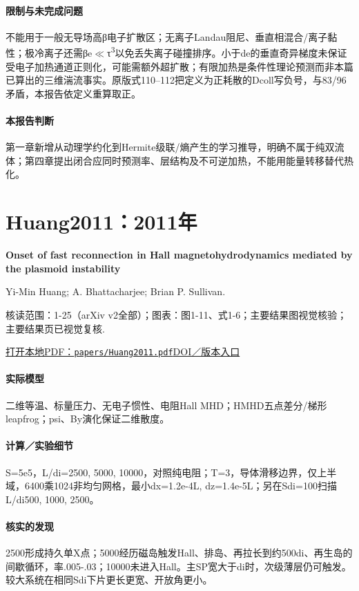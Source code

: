 \paragraph{限制与未完成问题}不能用于一般无导场高β电子扩散区；无离子Landau阻尼、垂直相混合/离子黏性；极冷离子还需βe\ensuremath{\ll}τ\textsuperscript{3}以免丢失离子碰撞排序。小于de的垂直奇异梯度未保证受电子加热通道正则化，可能需额外超扩散；有限加热是条件性理论预测而非本篇已算出的三维湍流事实。原版式110–112把定义为正耗散的Dcoll写负号，与83/96矛盾，本报告依定义重算取正。

\paragraph{本报告判断}第一章新增从动理学约化到Hermite级联/熵产生的学习推导，明确不属于纯双流体；第四章提出闭合应同时预测率、层结构及不可逆加热，不能用能量转移替代热化。

\section{Huang2011：2011年}\label{paper:Huang2011}

\textbf{Onset of fast reconnection in Hall magnetohydrodynamics mediated by the plasmoid instability}\citep{Huang2011}\

Yi-Min Huang;  A. Bhattacharjee;  Brian P. Sullivan.

\textsf{核读范围：}1-25（arXiv v2全部）；\textsf{图表：}图1-11、式1-6；主要结果图视觉核验；主要结果页已视觉复核.

\href{run:papers/Huang2011.pdf}{打开本地PDF：\texttt{papers/Huang2011.pdf}}\quad\href{https://doi.org/10.1063/1.3606363}{DOI／版本入口}

\paragraph{实际模型}二维等温、标量压力、无电子惯性、电阻Hall MHD；HMHD五点差分/梯形leapfrog；psi、By演化保证二维散度。

\paragraph{计算／实验细节}S=5e5，L/di=2500, 5000, 10000，对照纯电阻；T=3，导体滑移边界，仅上半域，6400乘1024非均匀网格，最小dx=1.2e-4L, dz=1.4e-5L；另在Sdi=100扫描L/di500, 1000, 2500。

\paragraph{核实的发现}2500形成持久单X点；5000经历磁岛触发Hall、排岛、再拉长到约500di、再生岛的间歇循环，率.005-.03；10000未进入Hall。主SP宽大于di时，次级薄层仍可触发。较大系统在相同Sdi下片更长更宽、开放角更小。

